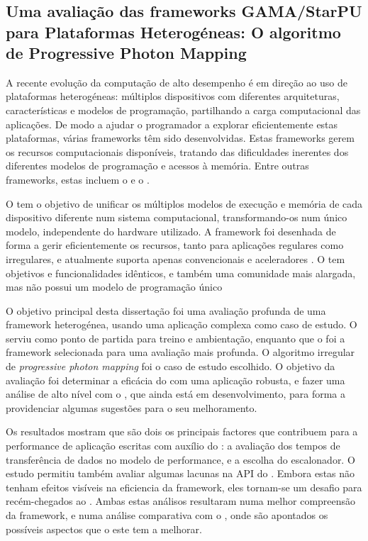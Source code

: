 \documentclass[main.tex]{subfiles}
\begin{document}
\cleardoublepage
{}
{}
\chapter*{\abstractname}
  \section*{Uma avaliação das frameworks GAMA/StarPU para Plataformas Heterogéneas: O algoritmo de Progressive Photon Mapping}

  A recente evolução da computação de alto desempenho é em direção ao uso de plataformas heterogéneas: múltiplos dispositivos com diferentes arquiteturas, características e modelos de programação, partilhando a carga computacional das aplicações. De modo a ajudar o programador a explorar eficientemente estas plataformas, várias frameworks têm sido desenvolvidas. Estas frameworks gerem os recursos computacionais disponíveis, tratando das dificuldades inerentes dos diferentes modelos de programação e acessos à memória. Entre outras frameworks, estas incluem o \gama e o \starpu.

  O \gama tem o objetivo de unificar os múltiplos modelos de execução e memória de cada dispositivo diferente num sistema computacional, transformando-os num único modelo, independente do hardware utilizado. A framework foi desenhada de forma a gerir eficientemente os recursos, tanto para aplicações regulares como irregulares, e atualmente suporta apenas \cpus convencionais e aceleradores \cuda. O \starpu tem objetivos e funcionalidades idênticos, e também uma comunidade mais alargada, mas não possui um modelo de programação único

  O objetivo principal desta dissertação foi uma avaliação profunda de uma framework heterogénea, usando uma aplicação complexa como caso de estudo. O \gama serviu como ponto de partida para treino e ambientação, enquanto que o \starpu foi a framework selecionada para uma avaliação mais profunda. O algoritmo irregular de \textit{progressive photon mapping} foi o caso de estudo escolhido. O objetivo da avaliação foi determinar a eficácia do \starpu com uma aplicação robusta, e fazer uma análise de alto nível com o \gama, que ainda está em desenvolvimento, para forma a providenciar algumas sugestões para o seu melhoramento.

  Os resultados mostram que são dois os principais factores que contribuem para a performance de aplicação escritas com auxílio do \starpu: a avaliação dos tempos de transferência de dados no modelo de performance, e a escolha do escalonador. O estudo permitiu também avaliar algumas lacunas na API do \starpu. Embora estas não tenham efeitos visíveis na eficiencia da framework, eles tornam-se um desafio para recém-chegados ao \starpu. Ambas estas análisos resultaram numa melhor compreensão da framework, e numa análise comparativa com o \gama, onde são apontados os possíveis aspectos que o este tem a melhorar.
\end{document}
